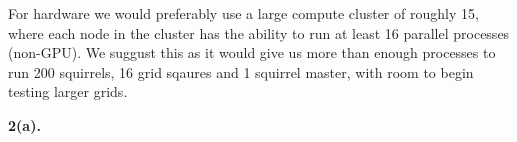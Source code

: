 \documentclass{article}
\begin{document}
For hardware we would preferably use a large compute cluster of roughly 15, where each node in the cluster has the ability to run at least 16 parallel processes (non-GPU). We suggust this as it would give us more than enough processes to run 200 squirrels, 16 grid sqaures and 1 squirrel master, with room to begin testing larger grids. \newline

\noindent\textbf{2(a).} \newline
\end{document}

